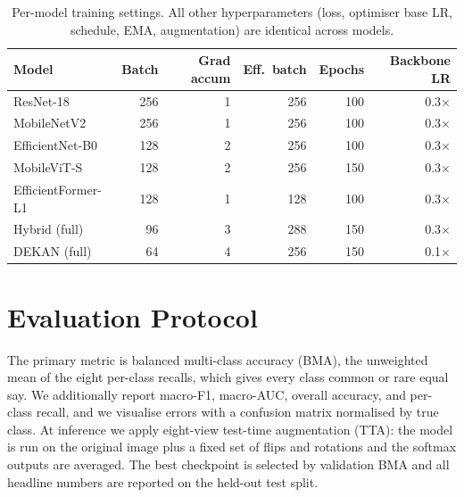 \begin{table}[H]
\centering
\caption{Per-model training settings. All other hyperparameters (loss, optimiser
base LR, schedule, EMA, augmentation) are identical across models.}
\label{tab:traincfg}
\begin{tabular}{lrrrrr}
\toprule
Model & Batch & Grad accum & Eff.\ batch & Epochs & Backbone LR \\
\midrule
ResNet-18           & 256 & 1 & 256 & 100 & 0.3$\times$ \\
MobileNetV2         & 256 & 1 & 256 & 100 & 0.3$\times$ \\
EfficientNet-B0     & 128 & 2 & 256 & 100 & 0.3$\times$ \\
MobileViT-S         & 128 & 2 & 256 & 150 & 0.3$\times$ \\
EfficientFormer-L1  & 128 & 1 & 128 & 100 & 0.3$\times$ \\
Hybrid (full)       & 96  & 3 & 288 & 150 & 0.3$\times$ \\
DEKAN (full)        & 64  & 4 & 256 & 150 & 0.1$\times$ \\
\bottomrule
\end{tabular}
\end{table}

\section{Evaluation Protocol}

The primary metric is balanced multi-class accuracy (BMA), the unweighted mean of
the eight per-class recalls, which gives every class common or rare equal
say. We additionally report macro-F1, macro-AUC, overall accuracy, and per-class
recall, and we visualise errors with a confusion matrix normalised by true class.
At inference we apply eight-view test-time augmentation (TTA): the model is run
on the original image plus a fixed set of flips and rotations and the softmax
outputs are averaged. The best checkpoint is selected by validation BMA and all
headline numbers are reported on the held-out test split.
